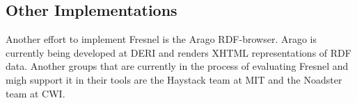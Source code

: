 \subsection{Other Implementations}

Another effort to implement Fresnel is the Arago RDF-browser. Arago is currently being developed at DERI and renders XHTML representations of RDF data\cite{Gassert05}. Another groups that are currently in the process of evaluating Fresnel and migh support it in their tools are the Haystack team at MIT\cite{Quan04} and the Noadster team at CWI\cite{Rutledge05}.


